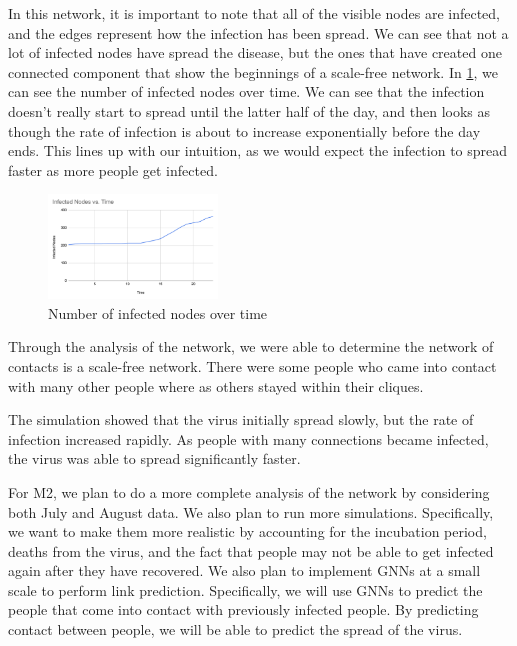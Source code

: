 \documentclass[times, 10pt,twocolumn]{article}
\begin{document}
In this network, it is important to note that all of the visible nodes are infected, and the edges represent how the infection has been spread. We can see that not a lot of infected nodes have spread the disease, but the ones that have created one connected component that show the beginnings of a scale-free network. In \ref{fig:my_label3}, we can see the number of infected nodes over time. We can see that the infection doesn't really start to spread until the latter half of the day, and then looks as though the rate of infection is about to increase exponentially before the day ends. This lines up with our intuition, as we would expect the infection to spread faster as more people get infected.
\begin{figure}
    \centering
    \includegraphics[width=0.4\textwidth]{imgs/infected_over_time.png}
    \caption{Number of infected nodes over time}
    \label{fig:my_label3}
\end{figure}


Through the analysis of the network, we were able to determine the network of contacts is a scale-free network. There were some people who came into contact with many other people where as others stayed within their cliques.

The simulation showed that the virus initially spread slowly, but the rate of infection increased rapidly. As people with many connections became infected, the virus was able to spread significantly faster.


For M2, we plan to do a more complete analysis of the network by considering both July and August data. We also plan to run more simulations. Specifically, we want to make them more realistic by accounting for the incubation period, deaths from the virus, and the fact that people may not be able to get infected again after they have recovered. We also plan to implement GNNs at a small scale to perform link prediction. Specifically, we will use GNNs to predict the people that come into contact with previously infected people. By predicting contact between people, we will be able to predict the spread of the virus.

\end{document}
